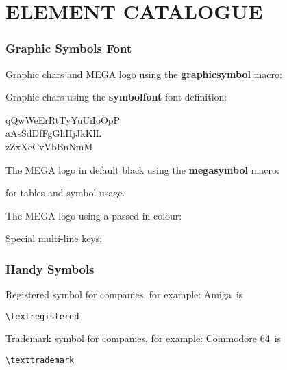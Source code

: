 %
%
%


\part{ELEMENT CATALOGUE}

\section{Graphic Symbols Font}

Graphic chars and MEGA logo using the {\bf graphicsymbol} macro:


Graphic chars using the {\bf symbolfont} font definition:

\begin{symbolfont}%
	qQwWeErRtTyYuUiIoOpP\\
	aAsSdDfFgGhHjJkKlL\\
	zZxXcCvVbBnNmM%
\end{symbolfont}%

The MEGA logo in default black using the {\bf megasymbol} macro:

\megasymbol for tables and symbol usage.

The MEGA logo using a passed in colour:

\megasymbol[black]
\megasymbol[brown]
\megasymbol[orange]
\megasymbol[blue]

Special multi-line keys:
%
%
%
%
%
%
%

\section{Handy Symbols}
Registered symbol for companies, for example: Amiga\textregistered \ is \begin{verbatim}
\textregistered
\end{verbatim}

Trademark symbol for companies, for example: Commodore 64\texttrademark \ is \begin{verbatim}
\texttrademark
\end{verbatim}

